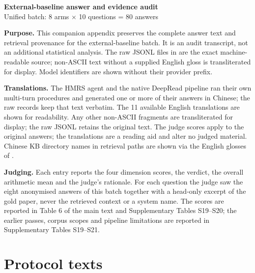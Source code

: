 \documentclass[10pt]{article}
\begin{document}
\begin{center}{\Large\bfseries External-baseline answer and evidence audit}\\[4pt]{\normalsize Unified batch: 8 arms $\times$ 10 questions = 80 answers}\end{center}
\textbf{Purpose.} This companion appendix preserves the complete answer text and retrieval provenance for the external-baseline batch. It is an audit transcript, not an additional statistical analysis. The raw JSONL files in  are the exact machine-readable source; non-ASCII text without a supplied English gloss is transliterated for display. Model identifiers are shown without their provider prefix.

\textbf{Translations.} The HMRS agent and the native DeepRead pipeline ran their own multi-turn procedures and generated one or more of their answers in Chinese; the raw records keep that text verbatim. The 11 available English translations are shown for readability. Any other non-ASCII fragments are transliterated for display; the raw JSONL retains the original text. The judge scores apply to the original answers; the translations are a reading aid and alter no judged material. Chinese KB directory names in retrieval paths are shown via the English glosses of .

\textbf{Judging.} Each entry reports the four dimension scores, the verdict, the overall arithmetic mean and the judge's rationale. For each question the judge saw the eight anonymised answers of this batch together with a head-only excerpt of the gold paper, never the retrieved context or a system name. The scores are reported in Table 6 of the main text and Supplementary Tables S19--S20; the earlier passes, corpus scopes and pipeline limitations are reported in Supplementary Tables S19--S21.

\tableofcontents
\clearpage
\section*{Protocol texts}
\end{document}
